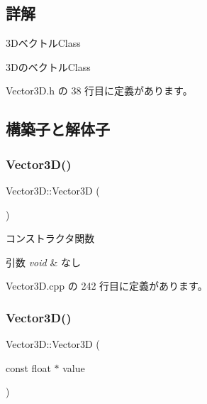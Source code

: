 \subsection{詳解}
3\+Dベクトル\+Class 

3\+Dのベクトル\+Class 

 Vector3\+D.\+h の 38 行目に定義があります。



\subsection{構築子と解体子}
\mbox{\label{class_vector3_d_a0b11a8d75da427b27443d8a94d0d296c}} 
\subsubsection{\texorpdfstring{Vector3\+D()}{Vector3D()}\hspace{0.1cm}{\footnotesize\ttfamily [1/5]}}
{\footnotesize\ttfamily Vector3\+D\+::\+Vector3D (\begin{DoxyParamCaption}{ }\end{DoxyParamCaption})}



コンストラクタ関数 


\begin{DoxyParams}{引数}
{\em void} & なし \\
\hline
\end{DoxyParams}


 Vector3\+D.\+cpp の 242 行目に定義があります。

\mbox{\label{class_vector3_d_a0e9cf75fc9744dba85c6936a7a5ab791}} 
\subsubsection{\texorpdfstring{Vector3\+D()}{Vector3D()}\hspace{0.1cm}{\footnotesize\ttfamily [2/5]}}
{\footnotesize\ttfamily Vector3\+D\+::\+Vector3D (\begin{DoxyParamCaption}\item[{const float $\ast$}]{value }\end{DoxyParamCaption})}



